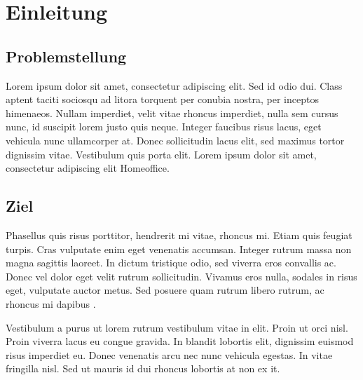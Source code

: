 \section{Einleitung}

\subsection{Problemstellung}
Lorem ipsum dolor sit amet, consectetur adipiscing elit. Sed id odio dui. Class aptent taciti sociosqu ad litora torquent per conubia nostra, per inceptos himenaeos. Nullam imperdiet, velit vitae rhoncus imperdiet, nulla sem cursus nunc, id suscipit lorem justo quis neque. Integer faucibus risus lacus, eget vehicula nunc ullamcorper at. Donec sollicitudin lacus elit, sed maximus tortor dignissim vitae. Vestibulum quis porta elit. Lorem ipsum dolor sit amet, consectetur adipiscing elit \gls{Homeoffice}.

\subsection{Ziel}
Phasellus quis risus porttitor, hendrerit mi vitae, rhoncus mi. Etiam quis feugiat turpis. Cras vulputate enim eget venenatis accumsan. Integer rutrum massa non magna sagittis laoreet. In dictum tristique odio, sed viverra eros convallis ac. Donec vel dolor eget velit rutrum sollicitudin. Vivamus eros nulla, sodales in risus eget, vulputate auctor metus. Sed posuere quam rutrum libero rutrum, ac rhoncus mi dapibus \autocite[][18-19]{hasselbringSoftwareArchitecturePresent2018}.\par
Vestibulum a purus ut lorem rutrum vestibulum vitae in elit. Proin ut orci nisl. Proin viverra lacus eu congue gravida. In blandit lobortis elit, dignissim euismod risus imperdiet eu. Donec venenatis arcu nec nunc vehicula egestas. In vitae fringilla nisl. Sed ut mauris id dui rhoncus lobortis at non ex \ac{it}.

